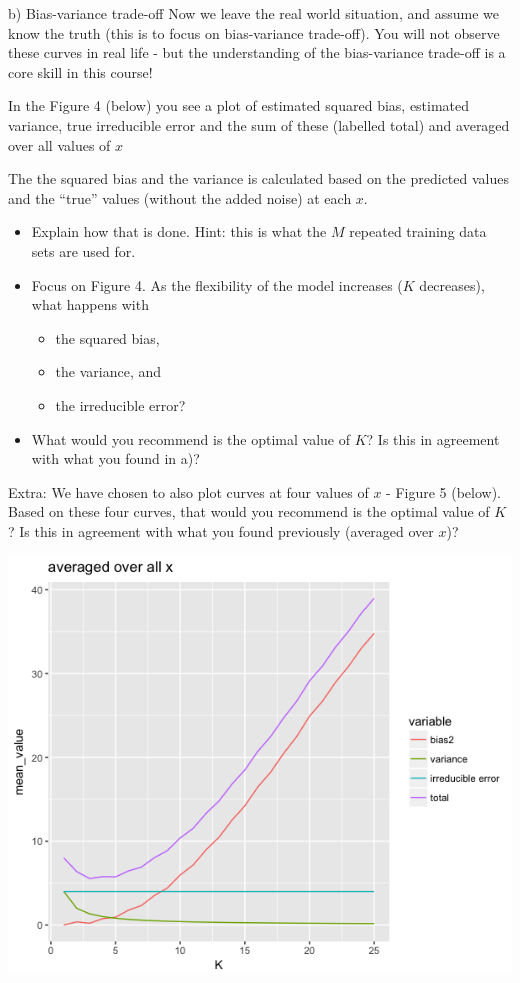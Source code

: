 \documentclass[ignorenonframetext,]{beamer}
\providecommand{\tightlist}{%
  \setlength{\itemsep}{0pt}\setlength{\parskip}{0pt}}
\begin{document}
\begin{frame}
\begin{block}{b) Bias-variance trade-off}
Now we leave the real world situation, and assume we know the truth
(this is to focus on bias-variance trade-off). You will not observe
these curves in real life - but the understanding of the bias-variance
trade-off is a core skill in this course!

In the Figure 4 (below) you see a plot of estimated squared bias,
estimated variance, true irreducible error and the sum of these
(labelled total) and averaged over all values of \(x\)

The the squared bias and the variance is calculated based on the
predicted values and the ``true'' values (without the added noise) at
each \(x\).

\begin{itemize}
\tightlist
\item
  Explain how that is done. Hint: this is what the \(M\) repeated
  training data sets are used for.
\item
  Focus on Figure 4. As the flexibility of the model increases (\(K\)
  decreases), what happens with

  \begin{itemize}
  \tightlist
  \item
    the squared bias,\\
  \item
    the variance, and\\
  \item
    the irreducible error?
  \end{itemize}
\item
  What would you recommend is the optimal value of \(K\)? Is this in
  agreement with what you found in a)?
\end{itemize}

Extra: We have chosen to also plot curves at four values of \(x\) -
Figure 5 (below). Based on these four curves, that would you recommend
is the optimal value of \(K\)? Is this in agreement with what you found
previously (averaged over \(x\))?

\includegraphics{Prob1f4.png}


\end{block}
\end{frame}
\end{document}
